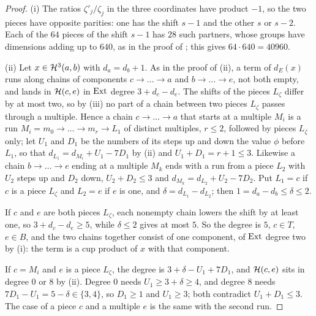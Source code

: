 \begin{proof}
(i) The ratios $\zeta'_{j}/\zeta_{j}$ in the three coordinates have
product $-1$, so the two pieces have opposite parities: one has the shift
$s-1$ and the other $s$ or $s-2$. Each of the $64$ pieces of the shift $s-1$
has $28$ such partners, whose groups have dimensions adding up to $640$, as
in the proof of ; this gives $64\cdot640=40960$.

(ii) Let $x\in\mathcal{H}^{3}(a,b)$ with $d_{a}=d_{b}+1$. As in the proof of
(ii), a term of $d_{E}(x)$ runs along chains of
components $c\to\dots\to a$ and $b\to\dots\to e$, not both empty, and lands
in $\mathcal{H}(c,e)$ in $\operatorname{Ext}$ degree $3+d_{c}-d_{e}$. The shifts of the pieces
$L_{\zeta}$ differ by at most two, so by (iii) no part
of a chain between two pieces $L_{\zeta}$ passes through a multiple. Hence a
chain $c\to\dots\to a$ that starts at a multiple $M_{i}$ is a run
$M_{i}=m_{0}\to\dots\to m_{r}\to L_{1}$ of distinct multiples, $r\le2$,
followed by pieces $L_{\zeta}$ only; let $U_{1}$ and $D_{1}$ be the numbers
of its steps up and down the value $\phi$ before $L_{1}$, so that
$d_{L_{1}}=d_{M_{i}}+U_{1}-7D_{1}$ by (ii) and
$U_{1}+D_{1}=r+1\le3$. Likewise a chain $b\to\dots\to e$ ending at a multiple
$M_{k}$ ends with a run from a piece $L_{2}$ with $U_{2}$ steps up and $D_{2}$
down, $U_{2}+D_{2}\le3$ and $d_{M_{k}}=d_{L_{2}}+U_{2}-7D_{2}$. Put
$L_{1}=c$ if $c$ is a piece $L_{\zeta}$ and $L_{2}=e$ if $e$ is one, and
$\delta=d_{L_{1}}-d_{L_{2}}$; then $1=d_{a}-d_{b}\le\delta\le2$.

If $c$ and $e$ are both pieces $L_{\zeta}$, each nonempty chain lowers the
shift by at least one, so $3+d_{c}-d_{e}\ge5$, while $\delta\le2$ gives at
most $5$. So the degree is $5$, $c\in T$, $e\in B$, and the two chains
together consist of one component, of $\operatorname{Ext}$ degree two by
(i): the term is a cup product of $x$ with that
component.

If $c=M_{i}$ and $e$ is a piece $L_{\zeta}$, the degree is
$3+\delta-U_{1}+7D_{1}$, and $\mathcal{H}(c,e)$ sits in degree $0$ or $8$ by
(ii). Degree $0$ needs $U_{1}\ge3+\delta\ge4$, and
degree $8$ needs $7D_{1}-U_{1}=5-\delta\in\{3,4\}$, so $D_{1}\ge1$ and
$U_{1}\ge3$; both contradict $U_{1}+D_{1}\le3$. The case of a piece $c$ and
a multiple $e$ is the same with the second run.


\end{proof}
